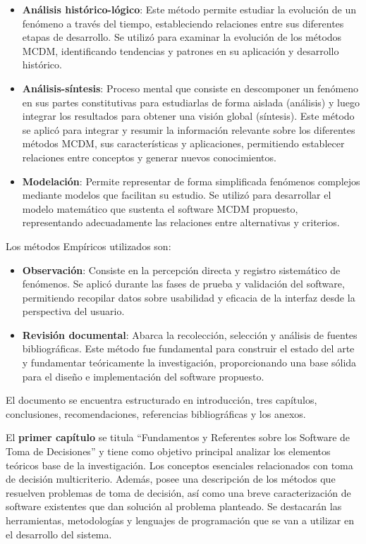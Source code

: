 \begin{itemize}
	\item \textbf{Análisis histórico-lógico}: Este método permite estudiar la evolución de un fenómeno a través del tiempo, estableciendo relaciones entre sus diferentes etapas de desarrollo. Se utilizó para examinar la evolución de los métodos MCDM, identificando tendencias y patrones en su aplicación y desarrollo histórico.
	
	\item \textbf{Análisis-síntesis}: Proceso mental que consiste en descomponer un fenómeno en sus partes constitutivas para estudiarlas de forma aislada (análisis) y luego integrar los resultados para obtener una visión global (síntesis). Este método se aplicó para integrar y resumir la información relevante sobre los diferentes métodos MCDM, sus características y aplicaciones, permitiendo establecer relaciones entre conceptos y generar nuevos conocimientos.
	
	\item \textbf{Modelación}: Permite representar de forma simplificada fenómenos complejos mediante modelos que facilitan su estudio. Se utilizó para desarrollar el modelo matemático que sustenta el software MCDM propuesto, representando adecuadamente las relaciones entre alternativas y criterios.
\end{itemize}

Los métodos Empíricos utilizados son:

\begin{itemize}
	\item \textbf{Observación}: Consiste en la percepción directa y registro sistemático de fenómenos. Se aplicó durante las fases de prueba y validación del software, permitiendo recopilar datos sobre usabilidad y eficacia de la interfaz desde la perspectiva del usuario.
	
	\item \textbf{Revisión documental}: Abarca la recolección, selección y análisis de fuentes bibliográficas. Este método fue fundamental para construir el estado del arte y fundamentar teóricamente la investigación, proporcionando una base sólida para el diseño e implementación del software propuesto.
\end{itemize}

El documento se encuentra estructurado en introducción, tres capítulos, conclusiones, recomendaciones, referencias bibliográficas y los anexos.

El \textbf{primer capítulo} se titula ``Fundamentos y Referentes sobre los Software de Toma de Decisiones'' y tiene como objetivo principal analizar los elementos teóricos base de la investigación. Los conceptos esenciales relacionados con toma de decisión multicriterio. Además, posee una descripción de los métodos que resuelven problemas de toma de decisión, así como una breve caracterización de software existentes que dan solución al problema planteado. Se destacarán las herramientas, metodologías y lenguajes de programación que se van a utilizar en el desarrollo del sistema.

